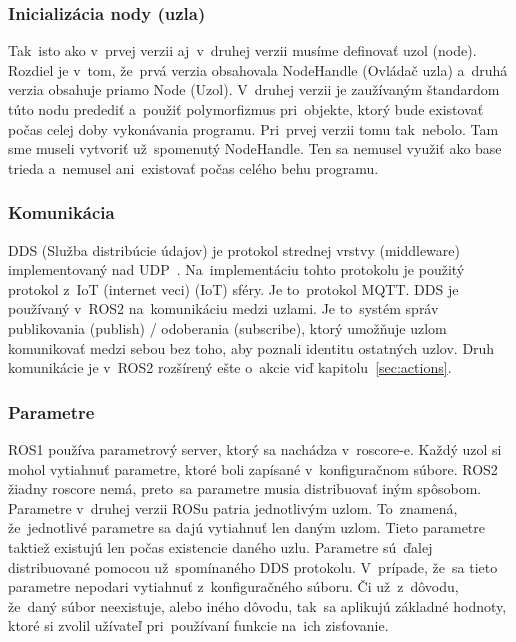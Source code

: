 \subsubsection{Inicializácia nody (uzla)}

	Tak~isto ako v~prvej verzii aj~v~druhej verzii musíme definovať uzol (node). Rozdiel je v~tom, že~prvá verzia obsahovala NodeHandle (Ovládač uzla)
	a~druhá verzia obsahuje priamo Node (Uzol). V~druhej verzii je zaužívaným štandardom túto nodu predediť a~použiť polymorfizmus pri~objekte,
	ktorý bude existovať počas celej doby vykonávania programu. Pri~prvej verzii tomu tak~nebolo. Tam sme museli vytvoriť už~spomenutý NodeHandle.
	Ten sa nemusel využiť ako base trieda a~nemusel ani~existovať počas celého behu programu.

\subsubsection{Komunikácia}

	DDS (Služba distribúcie údajov) je protokol strednej vrstvy (middleware) implementovaný nad UDP~\cite{ROS2book}. Na~implementáciu tohto protokolu
	je použitý protokol z~IoT (internet veci) (\acrlong{IoT}) sféry. Je to~protokol MQTT. DDS je používaný v~ROS2 na~komunikáciu medzi uzlami. Je
	to~systém správ publikovania (publish) / odoberania (subscribe), ktorý umožňuje uzlom komunikovať medzi sebou bez toho, aby poznali identitu
	ostatných uzlov. Druh komunikácie je v~ROS2 rozšírený ešte o~akcie viď kapitolu~\ref{sec:actions}.

\subsubsection{Parametre}

	ROS1 používa parametrový server, ktorý sa nachádza v~roscore-e. Každý uzol si mohol vytiahnuť parametre, ktoré boli zapísané v~konfiguračnom
	súbore. ROS2 žiadny roscore nemá, preto~sa parametre musia distribuovať iným spôsobom. Parametre v~druhej verzii ROSu patria jednotlivým uzlom.
	To~znamená, že~jednotlivé parametre sa dajú vytiahnuť len daným uzlom. Tieto parametre taktiež existujú len počas existencie daného uzlu. Parametre
	sú~ďalej distribuované pomocou už~spomínaného DDS protokolu. V~prípade, že~sa tieto parametre nepodari vytiahnuť z~konfiguračného súboru. Či už~z~dôvodu,
	že~daný súbor neexistuje, alebo iného dôvodu, tak~sa aplikujú základné hodnoty, ktoré si zvolil užívateľ pri~používaní funkcie na~ich zisťovanie.

